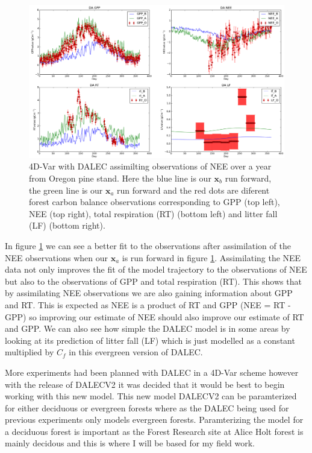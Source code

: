 \documentclass[11pt]{article}
\begin{document}
\begin{figure}[ht]
\centering
\includegraphics[height=.55\textwidth, ]{dacodeneeonly.png}
\caption{4D-Var with DALEC assimilting observations of NEE over a year from Oregon pine stand. Here the blue line is our $\textbf{x}_b$ run forward, the green line is our $\textbf{x}_a$ run forward and the red dots are diferent forest carbon balance observations corresponding to GPP (top left), NEE (top right), total respiration (RT) (bottom left) and litter fall (LF) (bottom right).}
\label{4dvardalec}
\end{figure}
In figure \ref{4dvardalec} we can see a better fit to the observations after assimilation of the NEE observations when our $\textbf{x}_a$ is run forward in figure \ref{4dvardalec}. Assimilating the NEE data not only improves the fit of the model trajectory to the observations of NEE but also to the observations of GPP and total respiration (RT). This shows that by assimilating NEE observations we are also gaining information about GPP and RT. This is expected as NEE is a product of RT and GPP (NEE = RT - GPP) so improving our estimate of NEE should also improve our estimate of RT and GPP. We can also see how simple the DALEC model is in some areas by looking at its prediction of litter fall (LF) which is just modelled as a constant multiplied by $C_f$ in this evergreen version of DALEC.

More experiments had been planned with DALEC in a 4D-Var scheme however with the release of DALECV2 \cite{Bloom2014} it was decided that it would be best to begin working with this new model. This new model DALECV2 can be paramterized for either deciduous or evergreen forests where as the DALEC being used for previous experiments only models evergreen forests. Paramterizing the model for a deciduous forest is important as the Forest Research site at Alice Holt forest is mainly decidous and this is where I will be based for my field work.
\end{document}
